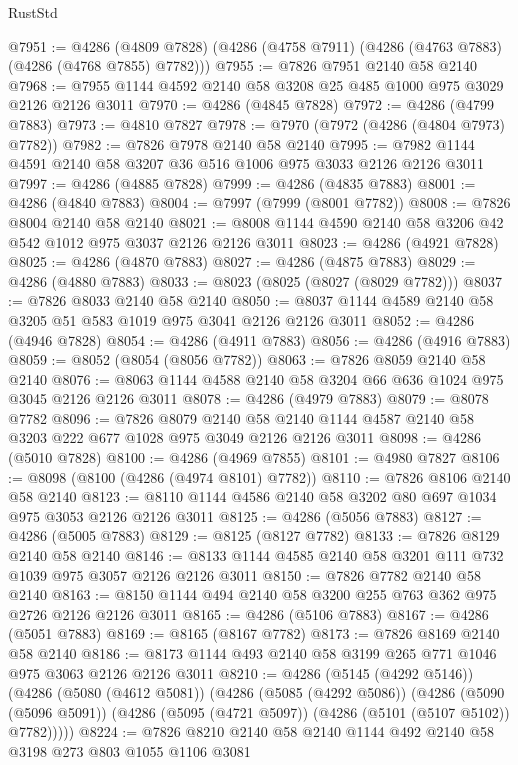 \begin{lexlean}{RustStd}
\begin{coremodule}
{\begin{coremodule}
{{{{{{{{{{{{{{{{@7951 := @4286 (@4809 @7828) (@4286 (@4758 @7911) (@4286 (@4763 @7883) (@4286 (@4768 @7855) @7782)))
@7955 := @7826 @7951 @2140 @58 @2140
@7968 := @7955 @1144 @4592 @2140 @58 @3208 @25 @485 @1000 @975 @3029 @2126 @2126 @3011
@7970 := @4286 (@4845 @7828)
@7972 := @4286 (@4799 @7883)
@7973 := @4810 @7827
@7978 := @7970 (@7972 (@4286 (@4804 @7973) @7782))
@7982 := @7826 @7978 @2140 @58 @2140
@7995 := @7982 @1144 @4591 @2140 @58 @3207 @36 @516 @1006 @975 @3033 @2126 @2126 @3011
@7997 := @4286 (@4885 @7828)
@7999 := @4286 (@4835 @7883)
@8001 := @4286 (@4840 @7883)
@8004 := @7997 (@7999 (@8001 @7782))
@8008 := @7826 @8004 @2140 @58 @2140
@8021 := @8008 @1144 @4590 @2140 @58 @3206 @42 @542 @1012 @975 @3037 @2126 @2126 @3011
@8023 := @4286 (@4921 @7828)
@8025 := @4286 (@4870 @7883)
@8027 := @4286 (@4875 @7883)
@8029 := @4286 (@4880 @7883)
@8033 := @8023 (@8025 (@8027 (@8029 @7782)))
@8037 := @7826 @8033 @2140 @58 @2140
@8050 := @8037 @1144 @4589 @2140 @58 @3205 @51 @583 @1019 @975 @3041 @2126 @2126 @3011
@8052 := @4286 (@4946 @7828)
@8054 := @4286 (@4911 @7883)
@8056 := @4286 (@4916 @7883)
@8059 := @8052 (@8054 (@8056 @7782))
@8063 := @7826 @8059 @2140 @58 @2140
@8076 := @8063 @1144 @4588 @2140 @58 @3204 @66 @636 @1024 @975 @3045 @2126 @2126 @3011
@8078 := @4286 (@4979 @7883)
@8079 := @8078 @7782
@8096 := @7826
    @8079
    @2140
    @58
    @2140
    @1144
    @4587
    @2140
    @58
    @3203
    @222
    @677
    @1028
    @975
    @3049
    @2126
    @2126
    @3011
@8098 := @4286 (@5010 @7828)
@8100 := @4286 (@4969 @7855)
@8101 := @4980 @7827
@8106 := @8098 (@8100 (@4286 (@4974 @8101) @7782))
@8110 := @7826 @8106 @2140 @58 @2140
@8123 := @8110 @1144 @4586 @2140 @58 @3202 @80 @697 @1034 @975 @3053 @2126 @2126 @3011
@8125 := @4286 (@5056 @7883)
@8127 := @4286 (@5005 @7883)
@8129 := @8125 (@8127 @7782)
@8133 := @7826 @8129 @2140 @58 @2140
@8146 := @8133 @1144 @4585 @2140 @58 @3201 @111 @732 @1039 @975 @3057 @2126 @2126 @3011
@8150 := @7826 @7782 @2140 @58 @2140
@8163 := @8150 @1144 @494 @2140 @58 @3200 @255 @763 @362 @975 @2726 @2126 @2126 @3011
@8165 := @4286 (@5106 @7883)
@8167 := @4286 (@5051 @7883)
@8169 := @8165 (@8167 @7782)
@8173 := @7826 @8169 @2140 @58 @2140
@8186 := @8173 @1144 @493 @2140 @58 @3199 @265 @771 @1046 @975 @3063 @2126 @2126 @3011
@8210 := @4286
    (@5145 (@4292 @5146))
    (@4286
      (@5080 (@4612 @5081))
      (@4286
        (@5085 (@4292 @5086))
        (@4286
          (@5090 (@5096 @5091))
          (@4286 (@5095 (@4721 @5097)) (@4286 (@5101 (@5107 @5102)) @7782)))))
@8224 := @7826 @8210 @2140 @58 @2140 @1144 @492 @2140 @58 @3198 @273 @803 @1055 @1106 @3081
}}}}}}}}}}}}}}}}
\end{coremodule}}
\end{coremodule}
\end{lexlean}
